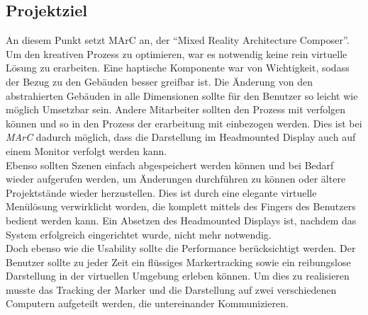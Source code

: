 \subsection{Projektziel}\label{sec:Projektziel}
An diesem Punkt setzt MArC an, der "`Mixed Reality Architecture Composer"'. 
Um den kreativen Prozess zu optimieren, war es notwendig keine rein virtuelle Lösung zu erarbeiten. Eine haptische Komponente war von Wichtigkeit, sodass der Bezug zu den Gebäuden besser greifbar ist. Die Änderung von den abstrahierten Gebäuden in alle Dimensionen sollte für den Benutzer so leicht wie möglich Umsetzbar sein. Andere Mitarbeiter sollten den Prozess mit verfolgen können und so in den Prozess der erarbeitung mit einbezogen werden. Dies ist bei \textit{MArC} dadurch möglich, dass die Darstellung im Headmounted Display auch auf einem Monitor verfolgt werden kann. \\
Ebenso sollten Szenen einfach abgespeichert werden können und bei Bedarf wieder aufgerufen werden, um Änderungen durchführen zu können oder ältere Projektstände wieder herzustellen. Dies ist durch eine elegante virtuelle Menülösung verwirklicht worden, die komplett mittels des Fingers des Benutzers bedient werden kann. Ein Absetzen des Headmounted Displays ist, nachdem das System erfolgreich eingerichtet wurde, nicht mehr notwendig.\\
Doch ebenso wie die Usability sollte die Performance berücksichtigt werden. Der Benutzer sollte zu jeder Zeit ein flüssiges Markertracking sowie ein reibungslose Darstellung in der virtuellen Umgebung erleben können. Um dies zu realisieren musste das Tracking der Marker und die Darstellung auf zwei verschiedenen Computern aufgeteilt werden, die untereinander Kommunizieren.\\























